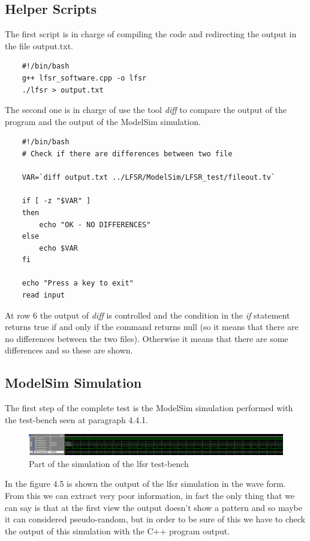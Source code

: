 \documentclass[a4paper]{report}
\begin{document}
\subsection{Helper Scripts}
The first script is in charge of compiling the code and redirecting the output in the file output.txt.
\lstset{ %
	language=sh }
\begin{lstlisting}	
	#!/bin/bash
	g++ lfsr_software.cpp -o lfsr
	./lfsr > output.txt
\end{lstlisting}

\noindent The second one is in charge of use the tool \emph{diff} to compare the output of the program and the output of the ModelSim simulation.
\begin{lstlisting}	
	#!/bin/bash
	# Check if there are differences between two file
	
	VAR=`diff output.txt ../LFSR/ModelSim/LFSR_test/fileout.tv`
	
	if [ -z "$VAR" ]
	then
		echo "OK - NO DIFFERENCES"
	else
		echo $VAR
	fi
	
	echo "Press a key to exit"
	read input
\end{lstlisting}

\noindent At row 6 the output of \emph{diff} is controlled and the condition in the \emph{if} statement returns true if and only if the command returns null (so it means that there are no differences between the two files). Otherwise it means that there are some differences and so these are shown.

\subsection{ModelSim Simulation}
The first step of the complete test is the ModelSim simulation performed with the test-bench seen at paragraph 4.4.1.
\begin{figure}[htpb]
	\centering
	\includegraphics[width=.64\textheight, height=.09\textheight]{img/tb/wave_lfsr_test2.png}
	\caption{Part of the simulation of the lfsr test-bench}
\end{figure}

\noindent In the figure 4.5 is shown the output of the lfsr simulation in the wave form. From this we can extract very poor information, in fact the only thing that we can say is that at the first view the output doesn't show a pattern and so maybe it can considered pseudo-random, but in order to be sure of this we have to check the output of this simulation with the C++ program output.
\end{document}
